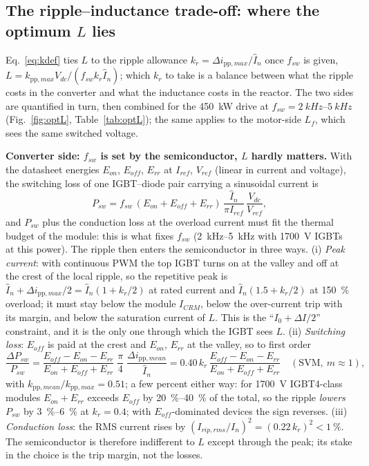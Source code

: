 \documentclass[10pt,a4paper]{scrartcl}
\newcommand{\Vdc}{V_{dc}}
\newcommand{\fsw}{f_{sw}}
\newcommand{\Lf}{L_{f}}
\newcommand{\pp}{\mathrm{pp}}
\begin{document}
\begin{onehalfspace}
\subsection{The ripple--inductance trade-off: where the optimum $L$ lies}
\label{sec:optL}
Eq.~\eqref{eq:kdef} ties $L$ to the ripple allowance $k_r = \Delta i_{\pp,max}/\hat I_n$ once $\fsw$ is given, $L = k_{\pp,max}\Vdc/(\fsw k_r \hat I_n)$; which $k_r$ to take is a balance between what the ripple costs in the converter and what the inductance costs in the reactor. The two sides are quantified in turn, then combined for the \SI{450}{kW} drive at $\fsw = \SIrange{2}{5}{kHz}$ (Fig.~\ref{fig:optL}, Table~\ref{tab:optL}); the same applies to the motor-side $\Lf$, which sees the same switched voltage.

\textbf{Converter side: $\fsw$ is set by the semiconductor, $L$ hardly matters.} With the datasheet energies $E_{on}$, $E_{off}$, $E_{rr}$ at $I_{ref}$, $V_{ref}$ (linear in current and voltage), the switching loss of one IGBT--diode pair carrying a sinusoidal current is
\begin{equation}
P_{sw} = \fsw\,(E_{on} + E_{off} + E_{rr})\,\frac{\hat I_n}{\pi I_{ref}}\,\frac{\Vdc}{V_{ref}},
\label{eq:Psw}
\end{equation}
and $P_{sw}$ plus the conduction loss at the overload current must fit the thermal budget of the module: this is what fixes $\fsw$ (\SIrange{2}{5}{kHz} with \SI{1700}{V} IGBTs at this power). The ripple then enters the semiconductor in three ways. (i) \emph{Peak current}: with continuous PWM the top IGBT turns on at the valley and off at the crest of the local ripple, so the repetitive peak is $\hat I_n + \Delta i_{\pp,max}/2 = \hat I_n(1 + k_r/2)$ at rated current and $\hat I_n(1.5 + k_r/2)$ at \SI{150}{\percent} overload; it must stay below the module $I_{CRM}$, below the over-current trip with its margin, and below the saturation current of $L$. This is the ``$I_0 + \Delta I/2$'' constraint, and it is the only one through which the IGBT sees $L$. (ii) \emph{Switching loss}: $E_{off}$ is paid at the crest and $E_{on}$, $E_{rr}$ at the valley, so to first order
\begin{equation}
\frac{\Delta P_{sw}}{P_{sw}} = \frac{E_{off} - E_{on} - E_{rr}}{E_{on} + E_{off} + E_{rr}}\;\frac{\pi}{4}\;\frac{\Delta i_{\pp,mean}}{\hat I_n}
= 0.40\,k_r\,\frac{E_{off} - E_{on} - E_{rr}}{E_{on} + E_{off} + E_{rr}}\quad (\text{SVM},\ m \approx 1),
\label{eq:dPsw}
\end{equation}
with $k_{\pp,mean}/k_{\pp,max} = 0.51$; a few percent either way: for \SI{1700}{V} IGBT4-class modules $E_{on} + E_{rr}$ exceeds $E_{off}$ by \SIrange{20}{40}{\percent} of the total, so the ripple \emph{lowers} $P_{sw}$ by \SIrange{3}{6}{\percent} at $k_r = 0.4$; with $E_{off}$-dominated devices the sign reverses. (iii) \emph{Conduction loss}: the RMS current rises by $(I_{rip,rms}/I_n)^2 = (0.22\,k_r)^2 < \SI{1}{\percent}$. The semiconductor is therefore indifferent to $L$ except through the peak; its stake in the choice is the trip margin, not the losses.


\end{onehalfspace}
\end{document}
